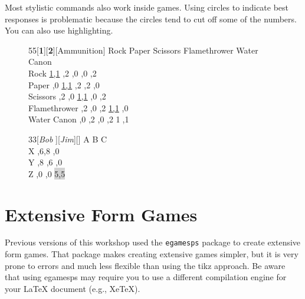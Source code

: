\documentclass[12pt]{article}
\begin{document}
Most stylistic commands also work inside games. Using circles to indicate best responses is problematic because the circles tend to cut off some of the numbers. You can also use highlighting.

\begin{figure}[h!]
\begin{footnotesize}
 \begin{center}
\begin{game}{5}{5}[\textbf{1}][\textbf{2}][Ammunition]
       \> Rock    \> Paper   \> Scissors \> Flamethrower \> Water Canon  \\
Rock \> \underline{1,1}  ,2  ,0 ,0 ,2 \\
 Paper ,0    \> \underline{1,1}  ,2 ,2 ,0 \\
 Scissors ,2 ,0 \> \underline{1,1} ,0 ,2 \\
Flamethrower ,2  ,0 ,2 \> \underline{1,1} ,0 \\
 Water Canon ,0 ,2 ,0 ,2 \> \textcircled{1},\textcircled{1} \\
\end{game}
\end{center}
\end{footnotesize}
\end{figure}

\sgcolsep=0.5pt
\renewcommand{\gamestretch}{1.5}
\def\highlight#1{\colorbox{lightgray}{#1}}
\fboxsep=5pt
\begin{figure}[htb]\hspace*{\fill}%
\begin{center}
\begin{game}{3}{3}[{\em Bob}     ][{\em Jim}][]
        \> A \> B \> C   \\
X ,6,8 ,0   \\
Y ,8  ,6 ,0 \\
Z ,0 ,0 \>\highlight{5,5}\\
\end{game} 
\end{center} 
\end{figure}
 
\FloatBarrier
\section{Extensive Form Games}
Previous versions of this workshop used the \verb+egamesps+ package to create extensive form games. That package makes creating extensive games simpler, but it is very prone to errors and much less flexible than using the tikz approach. Be aware that using egamesps may require you to use a different compilation engine for your {\LaTeX} document (e.g., XeTeX).
\end{document}
